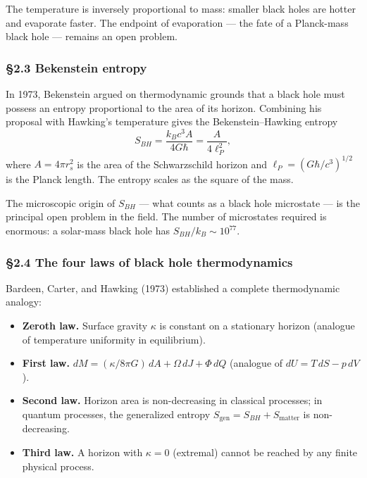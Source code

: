 \documentclass[a4paper,11pt]{article}
\theoremstyle{definition}
\providecommand{\tightlist}{\setlength{\itemsep}{0pt}\setlength{\parskip}{0pt}}
\begin{document}
The temperature is inversely proportional to mass: smaller black holes
are hotter and evaporate faster. The endpoint of evaporation --- the
fate of a Planck-mass black hole --- remains an open problem.

\subsubsection{§2.3 Bekenstein entropy}\label{bekenstein-entropy}

In 1973, Bekenstein argued on thermodynamic grounds that a black hole
must possess an entropy proportional to the area of its horizon.
Combining his proposal with Hawking's temperature gives the
Bekenstein--Hawking entropy
\[S_{BH} = \frac{k_B c^3 A}{4 G \hbar} = \frac{A}{4 \ell_P^2},\] where
\(A = 4\pi r_s^2\) is the area of the Schwarzschild horizon and
\(\ell_P = (G\hbar/c^3)^{1/2}\) is the Planck length. The entropy scales
as the square of the mass.

The microscopic origin of \(S_{BH}\) --- what counts as a black hole
microstate --- is the principal open problem in the field. The number of
microstates required is enormous: a solar-mass black hole has
\(S_{BH}/k_B \sim 10^{77}\).

\subsubsection{§2.4 The four laws of black hole
thermodynamics}\label{the-four-laws-of-black-hole-thermodynamics}

Bardeen, Carter, and Hawking (1973) established a complete thermodynamic
analogy:

\begin{itemize}
\tightlist
\item
  \textbf{Zeroth law.} Surface gravity \(\kappa\) is constant on a
  stationary horizon (analogue of temperature uniformity in
  equilibrium).
\item
  \textbf{First law.}
  \(dM = (\kappa / 8\pi G)\, dA + \Omega\, dJ + \Phi\, dQ\) (analogue of
  \(dU = T\, dS - p\, dV\)).
\item
  \textbf{Second law.} Horizon area is non-decreasing in classical
  processes; in quantum processes, the generalized entropy
  \(S_{\mathrm{gen}} = S_{BH} + S_{\mathrm{matter}}\) is non-decreasing.
\item
  \textbf{Third law.} A horizon with \(\kappa = 0\) (extremal) cannot be
  reached by any finite physical process.
\end{itemize}
\end{document}
